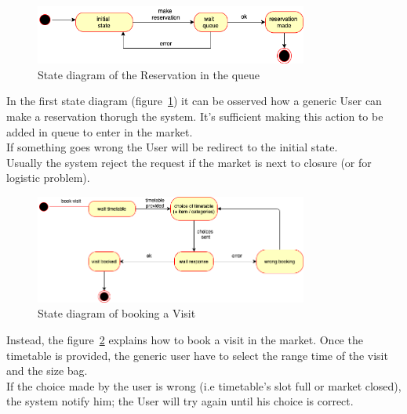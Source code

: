 \begin{figure}[h]
  \caption{State diagram of the Reservation in the queue}
  \label{fig:Reservation}
  \centering
  \includegraphics[width=0.8\textwidth, height=0.2\textwidth]{diagrams/2-reservation.png}

\end{figure}
\par 
\medskip

In the first state diagram (figure~\ref{fig:Reservation}) it can be osserved how a generic User can make a reservation thorugh the system. It's sufficient making this action to be added in queue to enter in the market.
\\If something goes wrong the User will be redirect to the initial state.
\\Usually the system reject the request if the market is next to closure (or for logistic problem).

\par 
\medskip

\begin{figure}[h]
  \caption{State diagram of booking a Visit}
  \label{fig:Visit}
  \centering
  \includegraphics[width=0.8\textwidth, height=0.4\textwidth]{diagrams/2-visit.png}
\end{figure}

\par 
\medskip

Instead, the figure~\ref{fig:Visit} explains how to book a visit in the market. Once the timetable is provided, the generic user have to select the range time of the visit and the size bag.
\\
If the choice made by the user is wrong (i.e timetable's slot full or market closed), the system notify him; the User will try again until his choice is correct.
\par 
\medskip


